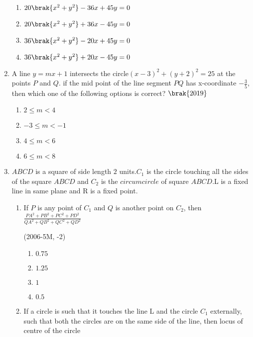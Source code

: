 \begin{enumerate}
\begin{multicols}{2}
             \begin{enumerate}
                 \item $20\brak{x^2+y^2}-36x+45y=0$
                 \item $20\brak{x^2+y^2}+36x-45y=0$
                 \item $36\brak{x^2+y^2}-20x+45y=0$
                 \item $36\brak{x^2+y^2}+20x-45y=0$
             \end{enumerate}
             \end{multicols}
             \item A line $y=mx+1$ intersects the circle$(x-3)^2+(y+2)^2=25$ at the points $P$ and $Q$. if the mid point of the line segment $PQ$ has x-coordinate $-\frac{3}{5}$,  then which one of the following options is correct?
                 \hfill$\brak{ 2019}$
                 \begin{multicols}{2}
             \begin{enumerate}
                 \item $2\le m<4$
                 \item $-3\le m<-1$
                 \item $4\le m<6$
                 \item $6\le m<8$
             \end{enumerate}
             \end{multicols}
\item $ABCD$ is a square of side length $2$ units.$C_1$ is the circle touching all the sides of the square $ABCD$ and $C_2$ is the $circumcircle$ of square $ABCD$.L is a fixed line in same plane and R is a fixed point.\\
\begin{enumerate}
\item If $P$ is any point of $C_1$ and $Q$ is another point on $C_2$, then $\frac{PA^2+PB^2+PC^2+PD^2}{QA^2+QB^2+QC^2+QD^2}$

\hfill(2006-5M, -2)
\begin{enumerate}
\item $0.75$
\item $1.25$
\item $1$
\item $0.5$
\end{enumerate}
\item If a circle is such that it touches the line L and the circle $C_1$ externally, such that both the circles are on the same side of the line, then locus of centre of the circle 


\end{enumerate}
\end{enumerate}

